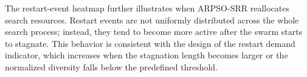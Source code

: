 The restart-event heatmap further illustrates when ARPSO-SRR reallocates search resources. Restart
events are not uniformly distributed across the whole search process; instead, they tend to become
more active after the swarm starts to stagnate. This behavior is consistent with the design of the
restart demand indicator, which increases when the stagnation length becomes larger or the
normalized diversity falls below the predefined threshold.
